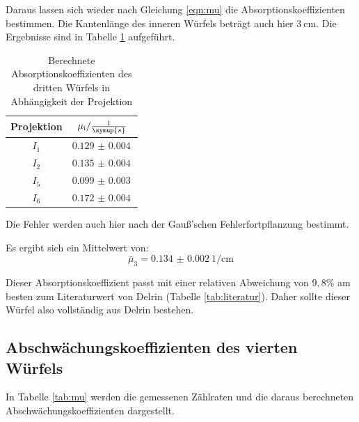 Daraus lassen sich wieder nach Gleichung \ref{eqn:mu} die Absorptionskoeffizienten bestimmen.
Die Kantenlänge des inneren Würfels beträgt auch hier $\SI{3}{\centi\meter}$.
Die Ergebnisse sind in Tabelle \ref{tab:mu3} aufgeführt.

\begin{table}[H]
  \centering
  \caption{Berechnete Absorptionskoeffizienten des dritten Würfels in Abhängigkeit der Projektion}
  \label{tab:mu3}
  \begin{tabular}{c c}
    \toprule
    Projektion & $\mu_{\mathrm{i}} / \frac{1}{\symup{s}}$   \\
    \midrule
        $I_1$    & $\SI{0.129(4)}{}$ \\
        $I_2$    & $\SI{0.135(4)}{}$ \\
        $I_5$    & $\SI{0.099(3)}{}$ \\
        $I_6$    & $\SI{0.172(4)}{}$ \\
    \bottomrule
  \end{tabular}
\end{table}

Die Fehler werden auch hier nach der Gauß'schen Fehlerfortpflanzung bestimmt.

Es ergibt sich ein Mittelwert von:
\begin{equation*}
  \bar\mu_3 = \SI{0.134(2)}{1\per\centi\meter}
\end{equation*}

Dieser Absorptionskoeffizient passt mit einer relativen Abweichung von $9,8$\% am
besten zum Literaturwert von Delrin (Tabelle \ref{tab:literatur}).
Daher sollte dieser Würfel also vollständig aus Delrin bestehen.

\subsection{Abschwächungskoeffizienten des vierten Würfels}
In Tabelle \ref{tab:mu} werden die gemessenen Zählraten und
die daraus berechneten Abschwächungskoeffizienten dargestellt.

